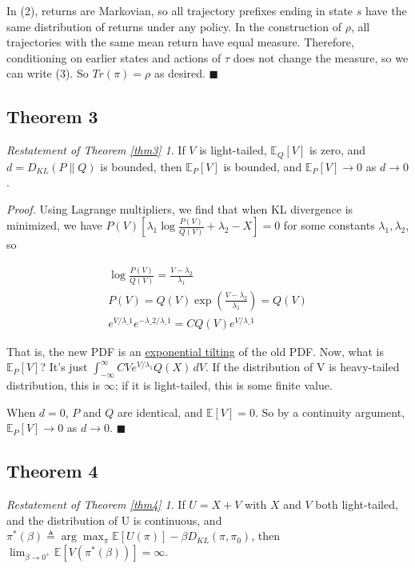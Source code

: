 \documentclass{article}
\theoremstyle{plain}
\theoremstyle{definition}
\theoremstyle{remark}
\begin{document}
In (2), returns are Markovian, so all trajectory prefixes ending in
state \(s\) have the same distribution of returns under any policy. In
the construction of \(\rho\), all trajectories with the same mean return
have equal measure. Therefore, conditioning on earlier states and
actions of \(\tau\) does not change the measure, so we can write (3). So
\(Tr(\pi)=\rho\) as desired. \(\blacksquare\)

\subsection{Theorem 3}
\newtheorem*{theorem3}{Restatement of Theorem \ref{thm3}}
\begin{theorem3} If \(V\) is light-tailed, \(\mathbb E_Q[V]\)
is zero, and \(d = D_{KL}(P \| Q)\) is bounded, then
\(\mathbb E_P[V]\) is bounded, and \(\mathbb E_P[V] \to 0\) as
\(d \to 0\).
\end{theorem3}

\emph{Proof.} Using Lagrange multipliers, we find that when KL divergence is
minimized, we have
\(P(V) [\lambda_1 \log \frac{P(V)}{Q(V)} + \lambda_2 - X] = 0\) for some
constants \(\lambda_1, \lambda_2\), so

\begin{align}\log \frac{P(V)}{Q(V)} = \frac{V - \lambda_2}{\lambda_1}
\\ P(V) = Q(V)\exp\left(\frac{V - \lambda_2}{\lambda_1}\right) = Q(V)
\\ e^{V/\lambda\_1} e^{-\lambda\_2/\lambda\_1} = C Q(V)
e^{V/\lambda\_1}
\end{align}

That is, the new PDF is an
\href{https://en.wikipedia.org/wiki/Exponential_tilting}{exponential
tilting} of the old PDF. Now, what is \(\mathbb E_P[V]\)? It's just
\(\int_{-\infty}^{\infty} C V e^{V/\lambda_1} Q(X) \,dV\). If the
distribution of V is heavy-tailed distribution, this is \(\infty\); if
it is light-tailed, this is some finite value.

When \(d = 0\), \(P\) and \(Q\) are identical, and \(\mathbb E[V] = 0\).
So by a continuity argument, \(\mathbb E_P[V] \to 0\) as \(d \to 0\).
\(\blacksquare\)

\subsection{Theorem 4}

\newtheorem*{theorem4}{Restatement of Theorem \ref{thm4}}
\begin{theorem4}
If \(U=X+V\) with \(X\) and \(V\) both
light-tailed, and the distribution of U is continuous, and
\(\pi^*(\beta) \triangleq \arg \max_\pi \mathbb E[U(\pi)] - \beta D_{KL}(\pi, \pi_0)\),
then \(\lim_{\beta \to 0^+} \mathbb E[V(\pi^*(\beta))] = \infty\).
\end{theorem4}
\end{document}
